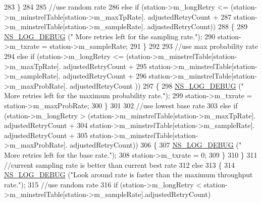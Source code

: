 \begin{DoxyCode}
283             \}
284 
285           \textcolor{comment}{//use random rate}
286           \textcolor{keywordflow}{else} \textcolor{keywordflow}{if} (station->m\_longRetry <= (station->m\_minstrelTable[station->m\_maxTpRate].
      adjustedRetryCount +
287                                             station->m\_minstrelTable[station->m\_sampleRate].
      adjustedRetryCount))
288             \{
289               \hyperlink{group__logging_ga413f1886406d49f59a6a0a89b77b4d0a}{NS\_LOG\_DEBUG} (\textcolor{stringliteral}{" More retries left for the sampling rate."});
290               station->m\_txrate = station->m\_sampleRate;
291             \}
292 
293           \textcolor{comment}{//use max probability rate}
294           \textcolor{keywordflow}{else} \textcolor{keywordflow}{if} (station->m\_longRetry <= (station->m\_minstrelTable[station->m\_maxTpRate].
      adjustedRetryCount +
295                                             station->m\_minstrelTable[station->m\_sampleRate].
      adjustedRetryCount +
296                                             station->m\_minstrelTable[station->m\_maxProbRate].
      adjustedRetryCount ))
297             \{
298               \hyperlink{group__logging_ga413f1886406d49f59a6a0a89b77b4d0a}{NS\_LOG\_DEBUG} (\textcolor{stringliteral}{" More retries left for the maximum probability rate."});
299               station->m\_txrate = station->m\_maxProbRate;
300             \}
301 
302           \textcolor{comment}{//use lowest base rate}
303           \textcolor{keywordflow}{else} \textcolor{keywordflow}{if} (station->m\_longRetry > (station->m\_minstrelTable[station->m\_maxTpRate].
      adjustedRetryCount +
304                                            station->m\_minstrelTable[station->m\_sampleRate].
      adjustedRetryCount +
305                                            station->m\_minstrelTable[station->m\_maxProbRate].
      adjustedRetryCount))
306             \{
307               \hyperlink{group__logging_ga413f1886406d49f59a6a0a89b77b4d0a}{NS\_LOG\_DEBUG} (\textcolor{stringliteral}{" More retries left for the base rate."});
308               station->m\_txrate = 0;
309             \}
310         \}
311       \textcolor{comment}{//current sampling rate is better than current best rate}
312       \textcolor{keywordflow}{else}
313         \{
314           \hyperlink{group__logging_ga413f1886406d49f59a6a0a89b77b4d0a}{NS\_LOG\_DEBUG} (\textcolor{stringliteral}{"Look around rate is faster than the maximum throughput rate."});
315           \textcolor{comment}{//use random rate}
316           \textcolor{keywordflow}{if} (station->m\_longRetry < station->m\_minstrelTable[station->m\_sampleRate].adjustedRetryCount)

\end{DoxyCode}
